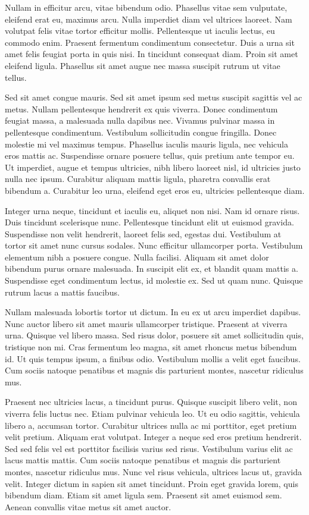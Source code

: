 Nullam in efficitur arcu, vitae bibendum odio. Phasellus vitae sem vulputate, eleifend erat eu, maximus arcu. Nulla imperdiet diam vel ultrices laoreet. Nam volutpat felis vitae tortor efficitur mollis. Pellentesque ut iaculis lectus, eu commodo enim. Praesent fermentum condimentum consectetur. Duis a urna sit amet felis feugiat porta in quis nisi. In tincidunt consequat diam. Proin sit amet eleifend ligula. Phasellus sit amet augue nec massa suscipit rutrum ut vitae tellus.

Sed sit amet congue mauris. Sed sit amet ipsum sed metus suscipit sagittis vel ac metus. Nullam pellentesque hendrerit ex quis viverra. Donec condimentum feugiat massa, a malesuada nulla dapibus nec. Vivamus pulvinar massa in pellentesque condimentum. Vestibulum sollicitudin congue fringilla. Donec molestie mi vel maximus tempus. Phasellus iaculis mauris ligula, nec vehicula eros mattis ac. Suspendisse ornare posuere tellus, quis pretium ante tempor eu. Ut imperdiet, augue et tempus ultricies, nibh libero laoreet nisl, id ultricies justo nulla nec ipsum. Curabitur aliquam mattis ligula, pharetra convallis erat bibendum a. Curabitur leo urna, eleifend eget eros eu, ultricies pellentesque diam.

Integer urna neque, tincidunt et iaculis eu, aliquet non nisi. Nam id ornare risus. Duis tincidunt scelerisque nunc. Pellentesque tincidunt elit ut euismod gravida. Suspendisse non velit hendrerit, laoreet felis sed, egestas dui. Vestibulum at tortor sit amet nunc cursus sodales. Nunc efficitur ullamcorper porta. Vestibulum elementum nibh a posuere congue. Nulla facilisi. Aliquam sit amet dolor bibendum purus ornare malesuada. In suscipit elit ex, et blandit quam mattis a. Suspendisse eget condimentum lectus, id molestie ex. Sed ut quam nunc. Quisque rutrum lacus a mattis faucibus.

Nullam malesuada lobortis tortor ut dictum. In eu ex ut arcu imperdiet dapibus. Nunc auctor libero sit amet mauris ullamcorper tristique. Praesent at viverra urna. Quisque vel libero massa. Sed risus dolor, posuere sit amet sollicitudin quis, tristique non mi. Cras fermentum leo magna, sit amet rhoncus metus bibendum id. Ut quis tempus ipsum, a finibus odio. Vestibulum mollis a velit eget faucibus. Cum sociis natoque penatibus et magnis dis parturient montes, nascetur ridiculus mus.

Praesent nec ultricies lacus, a tincidunt purus. Quisque suscipit libero velit, non viverra felis luctus nec. Etiam pulvinar vehicula leo. Ut eu odio sagittis, vehicula libero a, accumsan tortor. Curabitur ultrices nulla ac mi porttitor, eget pretium velit pretium. Aliquam erat volutpat. Integer a neque sed eros pretium hendrerit. Sed sed felis vel est porttitor facilisis varius sed risus. Vestibulum varius elit ac lacus mattis mattis. Cum sociis natoque penatibus et magnis dis parturient montes, nascetur ridiculus mus. Nunc vel risus vehicula, ultrices lacus ut, gravida velit. Integer dictum in sapien sit amet tincidunt. Proin eget gravida lorem, quis bibendum diam. Etiam sit amet ligula sem. Praesent sit amet euismod sem. Aenean convallis vitae metus sit amet auctor.

